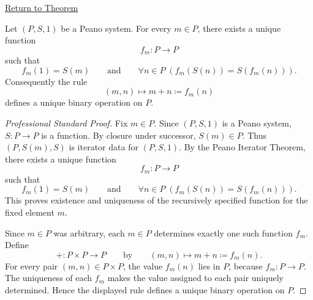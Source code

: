 \newpage
{}
\label{prf:addition-well-defined-on-peano-system}

\begin{remark*}[Return]
\hyperref[thm:addition-well-defined-on-peano-system]{Return to Theorem}
\end{remark*}

\begin{remark*}
\end{remark*}

\begin{theorem*}
Let $(P,S,1)$ be a Peano system. For every $m \in P$, there exists a unique
function
\[
f_m : P \to P
\]
such that
\[
f_m(1)=S(m)
\qquad\text{and}\qquad
\forall n \in P\;(f_m(S(n))=S(f_m(n))).
\]
Consequently the rule
\[
(m,n) \longmapsto m+n \coloneqq f_m(n)
\]
defines a unique binary operation on $P$.
\end{theorem*}

\begin{proof}[Professional Standard Proof]
\LRAProofBodyStart
Fix $m\in P$. Since $(P,S,1)$ is a Peano system, $S:P\to P$ is a function.
By closure under successor, $S(m)\in P$. Thus $(P,S(m),S)$ is iterator data
for $(P,S,1)$. By the Peano Iterator Theorem, there exists a unique function
\[
f_m:P\to P
\]
such that
\[
f_m(1)=S(m)
\qquad\text{and}\qquad
\forall n\in P\;(f_m(S(n))=S(f_m(n))).
\]
This proves existence and uniqueness of the recursively specified function
for the fixed element $m$.

Since $m\in P$ was arbitrary, each $m\in P$ determines exactly one such
function $f_m$. Define
\[
+:P\times P\to P
\qquad\text{by}\qquad
(m,n)\longmapsto m+n\coloneqq f_m(n).
\]
For every pair $(m,n)\in P\times P$, the value $f_m(n)$ lies in $P$, because
$f_m:P\to P$. The uniqueness of each $f_m$ makes the value assigned to each
pair uniquely determined. Hence the displayed rule defines a unique binary
operation on $P$.
\end{proof}

